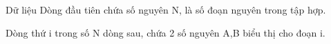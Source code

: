 Dữ liệu  
Dòng đầu tiên chứa số nguyên N, là số đoạn nguyên trong tập hợp.  

   Dòng thứ i trong số N dòng sau, chứa 2 số nguyên A,B  biểu thị cho đoạn i.
